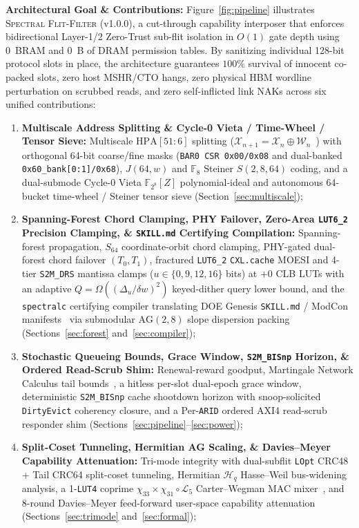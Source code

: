\documentclass[10pt,twocolumn]{article}
\providecommand{\ReleaseVersion}{v1.0.0}
\theoremstyle{spectralthm}
\begin{document}
\noindent\textbf{Architectural Goal \& Contributions:} Figure~\ref{fig:pipeline} illustrates \textsc{Spectral Flit-Filter} (\ReleaseVersion), a cut-through capability interposer that enforces bidirectional Layer-1/2 Zero-Trust sub-flit isolation in $O(1)$ gate depth using 0~BRAM and 0~B of DRAM permission tables. By sanitizing individual 128-bit protocol slots in place, the architecture guarantees $100\%$ survival of innocent co-packed slots, zero host MSHR/CTO hangs, zero physical HBM wordline perturbation on scrubbed reads, and zero self-inflicted link NAKs across six unified contributions:
\begin{enumerate}[label=(\arabic*)]
  \item \textbf{Multiscale Address Splitting \& Cycle-0 Vieta / Time-Wheel / Tensor Sieve:} Multiscale $\mathrm{HPA}[51:6]$ splitting ($\mathcal{X}_{n+1} = \mathcal{X}_n \oplus \mathcal{W}_n$~\cite{chen2001multilevel}) with orthogonal 64-bit coarse/fine masks (\texttt{BAR0 CSR 0x00/0x08} and dual-banked \texttt{0x60\_bank[0:1]/0x68}), $J(64,w)$ and $\mathbb{F}_8$ Steiner $S(2,8,64)$ coding, and a dual-submode Cycle-0 Vieta $\mathbb{F}_{2^8}[Z]$ polynomial-ideal and autonomous 64-bucket time-wheel / Steiner tensor sieve (Section~\ref{sec:multiscale});
  \item \textbf{Spanning-Forest Chord Clamping, PHY Failover, Zero-Area \texttt{LUT6\_2} Precision Clamping, \& \texttt{SKILL.md} Certifying Compilation:} Spanning-forest propagation, $S_{64}$ coordinate-orbit chord clamping, PHY-gated dual-forest chord failover $(T_0,T_1)$, fractured \mbox{\texttt{LUT6\_2}} \texttt{CXL.cache} MOESI and 4-tier \texttt{S2M\_DRS} mantissa clamps ($u \in \{0,9,12,16\}$ bits) at $+0$ CLB LUTs with an adaptive $Q = \Omega((\Delta_u/\delta w)^2)$ keyed-dither query lower bound, and the \texttt{spectralc} certifying compiler translating DOE Genesis \texttt{SKILL.md} / ModCon manifests~\cite{doe2025genesis} via submodular $\mathrm{AG}(2,8)$ slope dispersion packing (Sections~\ref{sec:forest} and~\ref{sec:compiler});
  \item \textbf{Stochastic Queueing Bounds, Grace Window, \texttt{S2M\_BISnp} Horizon, \& Ordered Read-Scrub Shim:} Renewal-reward goodput, Martingale Network Calculus tail bounds~\cite{poloczek2014martingale}, a hitless per-slot dual-epoch grace window, deterministic \texttt{S2M\_BISnp} cache shootdown horizon with snoop-solicited \texttt{DirtyEvict} coherency closure, and a Per-\texttt{ARID} ordered AXI4 read-scrub responder shim (Sections~\ref{sec:pipeline}--\ref{sec:power});
  \item \textbf{Split-Coset Tunneling, Hermitian AG Scaling, \& Davies--Meyer Capability Attenuation:} Tri-mode integrity with dual-subflit \texttt{LOpt} CRC48 + Tail CRC64 split-coset tunneling, Hermitian $\mathcal{H}_q$ Hasse--Weil bus-widening analysis, a 1-\texttt{LUT4} coprime $\chi_{33}\times\chi_{31}\circ\mathcal{L}_5$ Carter--Wegman MAC mixer~\cite{carter1979universal,daemen1995cipher}, and 8-round Davies--Meyer feed-forward user-space capability attenuation~\cite{birgisson2014macaroons} (Sections~\ref{sec:trimode} and~\ref{sec:formal});

\end{enumerate}
\end{document}
